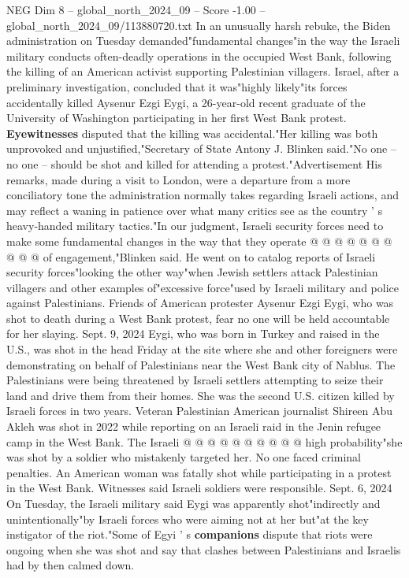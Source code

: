 \begin{textsample}{NEG Dim 8 – global\_north\_2024\_09 – Score -1.00 – global\_north\_2024\_09/113880720.txt}  \label{ex:f8_neg_369}
In an unusually harsh rebuke, the Biden administration on Tuesday demanded"fundamental changes"in the way the Israeli military conducts often-deadly operations in the occupied West Bank, following the killing of an American activist supporting Palestinian villagers.
Israel, after a preliminary investigation, concluded that it was"highly likely"its forces accidentally killed Aysenur Ezgi Eygi, a 26-year-old recent graduate of the University of Washington participating in her first West Bank protest. \textbf{Eyewitnesses} disputed that the killing was accidental."Her killing was both unprovoked and unjustified,"Secretary of State Antony J.
Blinken said."No one -- no one -- should be shot and killed for attending a protest."Advertisement His remarks, made during a visit to London, were a departure from a more conciliatory tone the administration normally takes regarding Israeli actions, and may reflect a waning in patience over what many critics see as the country ' s heavy-handed military tactics."In our judgment, Israeli security forces need to make some fundamental changes in the way that they operate @ @ @ @ @ @ @ @ @ @ of engagement,"Blinken said.
He went on to catalog reports of Israeli security forces"looking the other way"when Jewish settlers attack Palestinian villagers and other examples of"excessive force"used by Israeli military and police against Palestinians.
Friends of American protester Aysenur Ezgi Eygi, who was shot to death during a West Bank protest, fear no one will be held accountable for her slaying.
Sept. 9, 2024 Eygi, who was born in Turkey and raised in the U.S., was shot in the head Friday at the site where she and other foreigners were demonstrating on behalf of Palestinians near the West Bank city of Nablus.
The Palestinians were being threatened by Israeli settlers attempting to seize their land and drive them from their homes.
She was the second U.S. citizen killed by Israeli forces in two years.
Veteran Palestinian American journalist Shireen Abu Akleh was shot in 2022 while reporting on an Israeli raid in the Jenin refugee camp in the West Bank.
The Israeli @ @ @ @ @ @ @ @ @ @ high probability"she was shot by a soldier who mistakenly targeted her.
No one faced criminal penalties.
An American woman was fatally shot while participating in a protest in the West Bank.
Witnesses said Israeli soldiers were responsible.
Sept. 6, 2024 On Tuesday, the Israeli military said Eygi was apparently shot"indirectly and unintentionally"by Israeli forces who were aiming not at her but"at the key instigator of the riot."Some of Egyi ' s \textbf{companions} dispute that riots were ongoing when she was shot and say that clashes between Palestinians and Israelis had by then calmed down.

\end{textsample}
